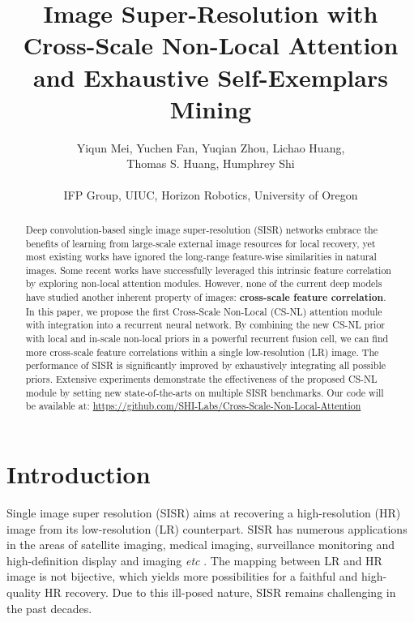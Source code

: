 \documentclass[10pt,twocolumn,letterpaper]{article}
\begin{document}
\title{Image Super-Resolution with Cross-Scale Non-Local Attention \\ and Exhaustive Self-Exemplars Mining}

\author{Yiqun Mei, Yuchen Fan, Yuqian Zhou, Lichao Huang, \\
Thomas S. Huang, Humphrey Shi\\
\\
{\small IFP Group, UIUC, Horizon Robotics, University of Oregon}}



\maketitle
\thispagestyle{empty}

\begin{abstract}
Deep convolution-based single image super-resolution (SISR) networks embrace the benefits of learning from large-scale external image resources for local recovery, yet most existing works have ignored the long-range feature-wise similarities in natural images. Some recent works have successfully leveraged this intrinsic feature correlation by exploring non-local attention modules. However, none of the current deep models have studied another inherent property of images: \textbf{cross-scale feature correlation}. In this paper, we propose the first Cross-Scale Non-Local (CS-NL) attention module with integration into a recurrent neural network. By combining the new CS-NL prior with local and in-scale non-local priors in a powerful recurrent fusion cell, we can find more cross-scale feature correlations within a single low-resolution (LR) image. The performance of SISR is significantly improved by exhaustively integrating all possible priors. Extensive experiments demonstrate the effectiveness of the proposed CS-NL module by setting new state-of-the-arts on multiple SISR benchmarks. Our code will be available at: \href{https://github.com/SHI-Labs/Cross-Scale-Non-Local-Attention}{https://github.com/SHI-Labs/Cross-Scale-Non-Local-Attention}
\end{abstract}
 
\section{Introduction}
Single image super resolution (SISR) aims at recovering a high-resolution (HR) image from its low-resolution (LR) counterpart. SISR has numerous applications in the areas of satellite imaging, medical imaging, surveillance monitoring and high-definition display and imaging \textit{etc} \cite{demirel2011discrete, yu2017computed,zhou2018survey,zhou2020image,zou2011very}. The mapping between LR and HR image is not bijective, which yields more possibilities for a faithful and high-quality HR recovery. Due to this ill-posed nature, SISR remains challenging in the past decades. 
\end{document}
